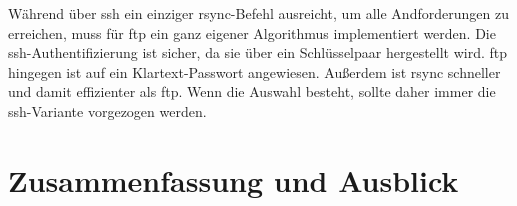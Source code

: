 Während über \gls{ssh} ein einziger rsync-Befehl ausreicht, um alle Andforderungen zu erreichen, muss für \gls{ftp} ein ganz eigener Algorithmus implementiert werden. Die \gls{ssh}-Authentifizierung ist sicher, da sie über ein Schlüsselpaar hergestellt wird. \gls{ftp} hingegen ist auf ein Klartext-Passwort angewiesen. Außerdem ist rsync schneller und damit effizienter als \gls{ftp}. Wenn die Auswahl besteht, sollte daher immer die \gls{ssh}-Variante vorgezogen werden.




\section{Zusammenfassung und Ausblick} %
\label{sec:zusammenfassung_und_ausblick}
